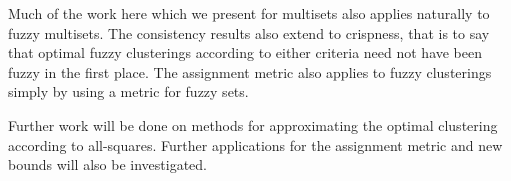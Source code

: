 Much of the work here which we present for multisets also applies naturally to
fuzzy multisets.  The consistency results also extend to crispness, that is to
say that optimal fuzzy clusterings according to either criteria need not have
been fuzzy in the first place.  The assignment metric also applies to fuzzy
clusterings simply by using a metric for fuzzy sets.

Further work will be done on methods for approximating the optimal clustering
according to all-squares.  Further applications for the assignment metric and
new bounds will also be investigated.



